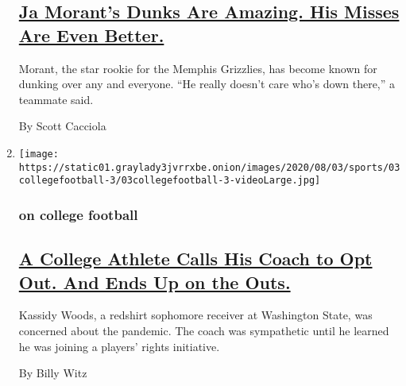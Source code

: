 \begin{enumerate}
  \hypertarget{ja-morants-dunks-are-amazing-his-misses-are-even-better}{%
  \subsection{\texorpdfstring{\href{/2020/08/03/sports/basketball/ja-morant-grizzlies-dunks.html}{Ja
  Morant's Dunks Are Amazing. His Misses Are Even
  Better.}}{Ja Morant's Dunks Are Amazing. His Misses Are Even Better.}}\label{ja-morants-dunks-are-amazing-his-misses-are-even-better}}

  Morant, the star rookie for the Memphis Grizzlies, has become known
  for dunking over any and everyone. ``He really doesn't care who's down
  there,'' a teammate said.

  By Scott Cacciola
\item
  \texttt{[image: https://static01.graylady3jvrrxbe.onion/images/2020/08/03/sports/03collegefootball-3/03collegefootball-3-videoLarge.jpg]}

  \hypertarget{on-college-football}{%
  \subsubsection{on college football}\label{on-college-football}}

  \hypertarget{a-college-athlete-calls-his-coach-to-opt-out-and-ends-up-on-the-outs}{%
  \subsection{\texorpdfstring{\href{/2020/08/03/sports/coronavirus-college-athletes-opt-out.html}{A
  College Athlete Calls His Coach to Opt Out. And Ends Up on the
  Outs.}}{A College Athlete Calls His Coach to Opt Out. And Ends Up on the Outs.}}\label{a-college-athlete-calls-his-coach-to-opt-out-and-ends-up-on-the-outs}}

  Kassidy Woods, a redshirt sophomore receiver at Washington State, was
  concerned about the pandemic. The coach was sympathetic until he
  learned he was joining a players' rights initiative.

  By Billy Witz
\end{enumerate}

